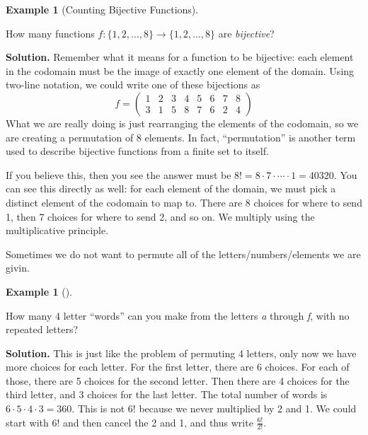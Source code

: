 \documentclass[10pt,]{book}
\theoremstyle{plain}
\theoremstyle{definition}
\newtheorem{example}[theorem]{Example}
\theoremstyle{definition}
\theoremstyle{definition}
\numberwithin{equation}{section}
\newcommand{\twoline}[2]{\begin{pmatrix}#1 \\ #2 \end{pmatrix}}
\newcommand{\amp}{ & }
\begin{document}
\begin{example}[Counting Bijective Functions]\label{ex_counting-functions-bijective}

          How many functions \(f:\{1,2,\ldots,8\} \to \{1,2,\ldots, 8\}\) are \emph{bijective}?
\par\medskip\noindent%
\textbf{Solution.}\quad 
          Remember what it means for a function to be bijective: each element in the codomain must be the image of exactly one element of the domain. Using two-line notation, we could write one of these bijections as
          \begin{equation*}
            f = \twoline{1 \amp 2 \amp 3 \amp 4 \amp 5 \amp 6 \amp 7 \amp 8} {3 \amp 1 \amp 5 \amp 8 \amp 7 \amp 6 \amp 2 \amp 4}
          \end{equation*}
          What we are really doing is just rearranging the elements of the codomain, so we are creating a permutation of 8 elements. In fact, ``permutation'' is another term used to describe bijective functions from a finite set to itself.
\par

          If you believe this, then you see the answer must be \(8! = 8 \cdot 7 \cdot\cdots\cdot 1 = 40320\). You can see this directly as well: for each element of the domain, we must pick a distinct element of the codomain to map to. There are 8 choices for where to send 1, then 7 choices for where to send 2, and so on. We multiply using the multiplicative principle.
\end{example}
\par

        Sometimes we do not want to permute all of the letters/numbers/elements we are givin.
\begin{example}[]\label{example-33}

            How many 4 letter ``words'' can you make from the letters \emph{a} through \emph{f}, with no repeated letters?
\par\medskip\noindent%
\textbf{Solution.}\quad 
            This is just like the problem of permuting 4 letters, only now we have more choices for each letter. For the first letter, there are 6 choices. For each of those, there are 5 choices for the second letter. Then there are 4 choices for the third letter, and 3 choices for the last letter. The total number of words is \(6\cdot 5\cdot 4 \cdot 3 = 360\). This is not \(6!\) because we never multiplied by 2 and 1. We could start with \(6!\) and then cancel the 2 and 1, and thus write \(\frac{6!}{2!}\).
\end{example}
\par
\end{document}
